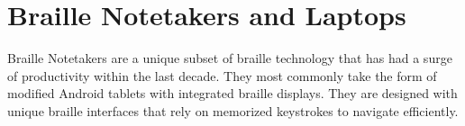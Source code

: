 \documentclass[14pt,letterpaper,twoside]{extreport}
\begin{document}
\pagebreak \hypertarget{braille-notetakers-and-braille-laptop-computers}{%
	\section{Braille Notetakers and Laptops}\label{braille-notetakers-and-braille-laptop-computers}}

Braille Notetakers are a unique subset of braille technology that has had a surge of productivity within the last decade. They most commonly take the form of modified Android tablets with integrated braille displays. They are designed with unique braille interfaces that rely on memorized keystrokes to navigate efficiently. 

\begin{longtable}[]{@{}
	>{\raggedright\arraybackslash}m{}
	>{\raggedright\arraybackslash}m{}
	>{\raggedright\arraybackslash}m{}
	>{\raggedright\arraybackslash}m{}
	>{\raggedright\arraybackslash}m{}
	>{\raggedright\arraybackslash}b{}@{}
	}
	\toprule


\end{longtable}
\end{document}
